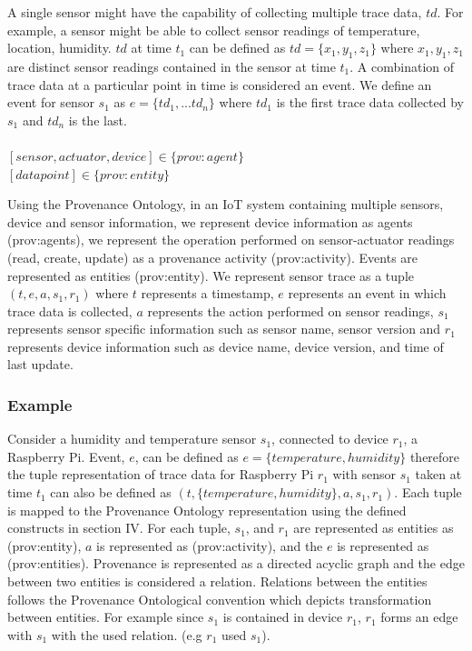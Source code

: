 \documentclass[conference]{IEEEtran}
\begin{document}
\par A single sensor might have the capability of collecting multiple trace data, $td$. For example, a sensor might be able to collect sensor readings of temperature, location, humidity. $td$ at time $t_1$ can be defined as $td = \{ x_1, y_1, z_1 \}$ where $x_1, y_1, z_1$ are distinct sensor readings contained in the sensor at time $t_1$. A combination of trace data at a particular point in time is considered an event. We define an event  for sensor $s_1$ as $e= \{td_1, ...td_n\} $ where $td_1$ is the first trace data collected by $s_1$  and $td_n$ is the last. \\ \\ $[sensor, actuator, device] \in \{prov:agent\}$  \\ $[datapoint] \in \{prov:entity\} $ \\



\par Using the Provenance Ontology, in an IoT system containing multiple sensors, device and sensor information, we represent device information as agents (prov:agents), we represent the operation performed on sensor-actuator readings (read, create, update) as a provenance activity (prov:activity). Events are represented as entities (prov:entity). We represent sensor trace as a tuple  $ (t, e, a, s_1, r_1)$ where $t$ represents a timestamp, $e$ represents an event in which trace data is collected, $a$ represents the action performed on sensor readings, $s_1$ represents sensor specific information such as sensor name, sensor version and $r_1$ represents device information such as device name, device version, and time of last update.






\subsubsection{Example} 

Consider a humidity and temperature sensor $s_1$, connected to device $r_1$, a Raspberry Pi. Event, $e$, can be defined as $e= \{temperature, humidity\}$ therefore the tuple representation of trace data for Raspberry Pi $r_1$ with sensor $s_1$ taken at time $t_1$ can also be defined as $(t, \{temperature, humidity\}, a,  s_1, r_1)$. Each tuple is mapped to the Provenance Ontology representation using the defined constructs in section IV. For each tuple,  $s_1$, and $r_1$ are represented as entities as (prov:entity), $a$ is represented as (prov:activity), and the $e$ is represented as (prov:entities).  Provenance is represented as a directed acyclic graph and the edge between two entities is considered a relation. Relations between the entities follows the Provenance Ontological convention which depicts transformation between entities. For example since $s_1$ is contained in device $r_1$, $r_1$ forms an edge with $s_1$ with the used relation. (e.g $r_1$ used $s_1$).
\end{document}
